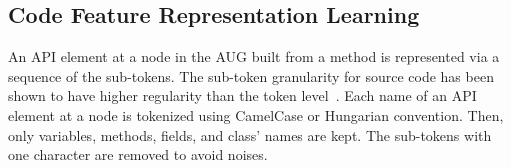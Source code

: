 \subsection{Code Feature Representation Learning}
\label{sec:features}

An API element at a node in the AUG built from a method is represented
via a sequence of the sub-tokens. The sub-token granularity for source
code has been shown to have higher regularity than the token
level~\cite{icse20-methodname}. Each name of an API element at a node
is tokenized using CamelCase or Hungarian convention. Then, only
variables, methods, fields, and class' names are kept. The sub-tokens
with one character are removed to avoid noises.
